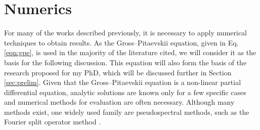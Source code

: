 \section{Numerics}\label{sec:numerics}
For many of the works described previously, it is necessary to apply numerical techniques to obtain results. As the Gross--Pitaevskii
equation, given in Eq. \eqref{eqn:gpe}, is used in the majority of the literature cited, we will consider it as the basis for the following discussion. This equation will also form the basis of the research proposed for my PhD, which will be discussed further in Section \ref{sec:prelim}. Given that the Gross--Pitaevskii equation is a non-linear partial differential equation, analytic solutions are known only for a few specific cases and numerical methods for evaluation are often necessary. Although many methods exist, one widely used family are pseudospectral methods, such as the Fourier split operator method \cite{Num:Bauke_cpc_2011}.

